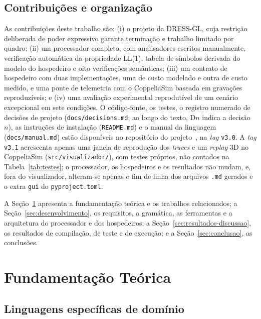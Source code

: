 \documentclass[conference]{IEEEtran}
\begin{document}
\subsection{Contribuições e organização}
\label{sec:contrib}

As contribuições deste trabalho são: (i) o projeto da DRESS-GL, cuja restrição
deliberada de poder expressivo garante terminação e trabalho limitado por
quadro; (ii) um processador completo, com analisadores escritos manualmente,
verificação automática da propriedade LL(1), tabela de símbolos derivada do
modelo do hospedeiro e oito verificações semânticas; (iii) um contrato de
hospedeiro com duas implementações, uma de custo modelado e outra de custo
medido, e uma ponte de telemetria com o CoppeliaSim baseada em gravações
reproduzíveis; e (iv) uma avaliação experimental reprodutível de um cenário
excepcional em sete condições. O código-fonte, os testes, o registro numerado
de decisões de projeto (\texttt{docs/decisions.md}; ao longo do texto, D$n$
indica a decisão $n$), as instruções de instalação (\texttt{README.md}) e o
manual da linguagem (\texttt{docs/manual.md}) estão disponíveis no
repositório do projeto~\cite{dressgl}, na \textit{tag} \texttt{v3.0}. A \textit{tag} \texttt{v3.1} acrescenta apenas uma janela de
reprodução dos \textit{traces} e um \textit{replay} 3D no CoppeliaSim
(\texttt{src/visualizador/}), com testes próprios, não contados na
Tabela~\ref{tab:testes}; o processador, os hospedeiros e os resultados não
mudam, e, fora do visualizador, alteram-se apenas o fim de linha dos arquivos
\texttt{.md} gerados e o extra \texttt{gui} do \texttt{pyproject.toml}.

A Seção~\ref{sec:fundamentacao} apresenta a fundamentação teórica e os
trabalhos relacionados; a Seção~\ref{sec:desenvolvimento}, os requisitos, a
gramática, as ferramentas e a arquitetura do processador e dos hospedeiros; a
Seção~\ref{sec:resultados-discussao}, os resultados de compilação, de teste e
de execução; e a Seção~\ref{sec:conclusao}, as conclusões.

\section{Fundamentação Teórica}
\label{sec:fundamentacao}

\subsection{Linguagens específicas de domínio}
\label{sec:dsl}
\end{document}

